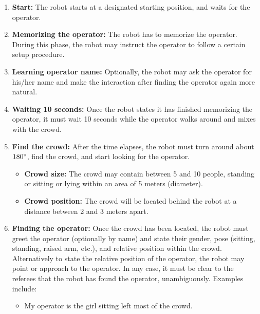 \begin{enumerate}

  \item \textbf{Start:} The robot starts at a designated starting position, and waits for the  operator.

  \item \textbf{Memorizing the operator:} The robot has to memorize the operator.   During this phase, the robot may instruct the operator to follow a certain setup procedure.

  \item \textbf{Learning operator name:} Optionally, the robot may ask the operator for his/her name and make the interaction after finding the operator again more natural.

  \item \textbf{Waiting 10 seconds:} Once the robot states it has finished memorizing the operator, it must wait 10 seconds while the operator walks around and mixes with the crowd.

  \item \textbf{Find the crowd:} After the time elapses, the robot must turn around about $180\degree$, find the crowd, and start looking for the operator.
  \begin{itemize}

    \item \textbf{Crowd size:} The crowd may contain between 5 and 10 people, standing or sitting or lying within an  area of 5 meters (diameter).

    \item \textbf{Crowd position:} The crowd will be located behind the robot at a distance between 2 and 3 meters apart.
  \end{itemize}

  \item \textbf{Finding the operator:} Once the crowd has been located, the robot must greet the operator (optionally by name) and state their gender, pose (sitting, standing, raised arm, etc.), and relative position within the crowd.   Alternatively to state the relative position of the operator, the robot may point or approach to the operator. In any case, it must be clear to the referees that the robot has found the operator, unambiguously. Examples include:
  \begin{itemize}

    \item My operator is the girl sitting left most of the crowd.


\end{itemize}
\end{enumerate}
